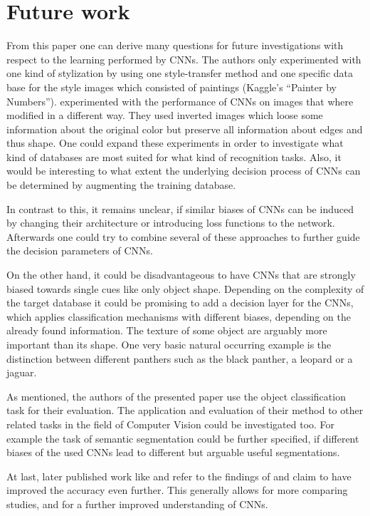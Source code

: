 \documentclass[runningheads,a4paper]{llncs}
\begin{document}
\section{Future work}

From this paper one can derive many questions for future investigations with respect to the learning performed by CNNs. The authors only experimented with one kind of stylization by using one style-transfer method \citep{huang2017arbitrary} and one specific data base for the style images which consisted of paintings (Kaggle's ``Painter by Numbers''). \citet{hosseini2018assessing} experimented with the performance of CNNs on images that where modified in a different way. They used inverted images which loose some information about the original color but preserve all information about edges and thus shape. One could expand these experiments in order to investigate what kind of databases are most suited for what kind of recognition tasks. Also, it would be interesting to what extent the underlying decision process of CNNs can be determined by augmenting the training database.

In contrast to this, it remains unclear, if similar biases of CNNs can be induced by changing their architecture or introducing loss functions to the network. Afterwards one could try to combine several of these approaches to further guide the decision parameters of CNNs.

On the other hand, it could be disadvantageous to have CNNs that are strongly biased towards single cues like only object shape. Depending on the complexity of the target database it could be promising to add a decision layer for the CNNs, which applies classification mechanisms with different biases, depending on the already found information. The texture of some object are arguably more important than its shape. One very basic natural occurring example is the distinction between different panthers such as the black panther, a leopard or a jaguar.

As mentioned, the authors of the presented paper use the object classification task for their evaluation. The application and evaluation of their method to other related tasks in the field of Computer Vision could be investigated too. For example the task of semantic segmentation could be further specified, if different biases of the used CNNs lead to different but arguable useful segmentations.

At last, later published work like \citet{xie2020self} and \citet{xie2020adversarial} refer to the findings of \citet{geirhos2018imagenet} and claim to have improved the accuracy even further. This generally allows for more comparing studies, and for a further improved understanding of CNNs.



\printbibliography
\end{document}
